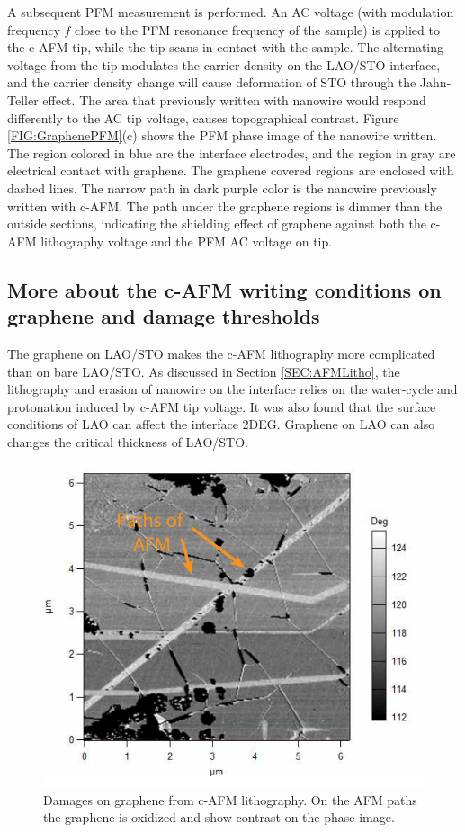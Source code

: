 \documentclass[pdflatex, sectionletters, 12pt]{pittetd}    %
\begin{document}
A subsequent PFM measurement is performed. An AC voltage (with modulation frequency $f$ close to the PFM resonance frequency of the sample) is applied to the c-AFM tip, while the tip scans in contact with the sample. The alternating voltage from the tip modulates the carrier density on the LAO/STO interface, and the carrier density change will cause deformation of STO through the Jahn-Teller effect\cite{vonk2007interface, salluzzo2009orbital, park2006charge}. The area that previously written with nanowire would respond differently to the AC tip voltage, causes topographical contrast\cite{huang2013direct}. Figure \ref{FIG:GraphenePFM}(c) shows the PFM phase image of the nanowire written. The region colored in blue are the interface electrodes, and the region in gray are electrical contact with graphene. The graphene covered regions are enclosed with dashed lines. The narrow path in dark purple color is the nanowire previously written with c-AFM. The path under the graphene regions is dimmer than the outside sections, indicating the shielding effect of graphene against both the c-AFM lithography voltage and the PFM AC voltage on tip.


\subsection{More about the c-AFM writing conditions on graphene and damage thresholds}

The graphene on LAO/STO makes the c-AFM lithography more complicated than on bare LAO/STO. As discussed in Section \ref{SEC:AFMLitho}, the lithography and erasion of nanowire on the interface relies on the water-cycle and protonation induced by c-AFM tip voltage. It was also found that the surface conditions of LAO can affect the interface 2DEG\cite{brown2016giant, xie2011control, xie2013enhancing}. Graphene on LAO can also changes the critical thickness of LAO/STO\cite{aliaj2018probing}. 
\\

\begin{figure}[h!]
	\centering
	\includegraphics[width=.7\textwidth]{Drawing/GrapheneDamages.pdf}
	\caption{Damages on graphene from c-AFM lithography. On the AFM paths the graphene is oxidized and show contrast on the phase image.}
	\label{FIG:GrapheneDamages}
\end{figure}
\end{document}
